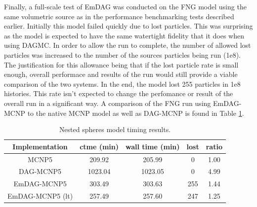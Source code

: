 \documentclass[12pt, a4paper]{article}
\begin{document}
Finally, a full-scale test of EmDAG was conducted on the FNG model using the same volumetric source as in the performance benchmarking tests described earlier. Initially this model failed quickly due to lost particles. This was surprising as the model is expected to have the same watertight fidelity that it does when using DAGMC. In order to allow the run to complete, the number of allowed lost particles was increased to the number of the sources particles being run (1e8). The justification for this allowance being that if the lost particle rate is small enough, overall performace and results of the run would still provide a viable comparison of the two systems. In the end, the model lost 255 particles in 1e8 histories. This rate isn't expected to change the perfomance or result of the overall run in a significant way. A comparison of the FNG run using EmDAG-MCNP to the native MCNP model as well as DAG-MCNP is found in Table \ref{fngemdag}.


\begin{table}[H]
  \small
  \begin{center}
        \begin{tabular}{|c|c|c|c|c|}
      \hline
      \textbf{Implementation} & \textbf{ctme (min)} & \textbf{wall time (min)} & \textbf{lost} & \textbf{ratio} \\
      \hline
      MCNP5 & 209.92 & 205.99 & 0 & 1.00 \\
      \hline
      DAG-MCNP5 & 1023.04 & 1023.05 & 0 & 4.99 \\
      \hline
      EmDAG-MCNP5 & 303.49 & 303.63 & 255 & 1.44 \\
      \hline
      EmDAG-MCNP5 (lt) & 257.49 & 257.60 & 247 & 1.25 \\
      \hline
    \end{tabular} 
    \caption{Nested spheres model timing results.}
    \label{fngemdag}
  \end{center}
\end{table}
\end{document}
